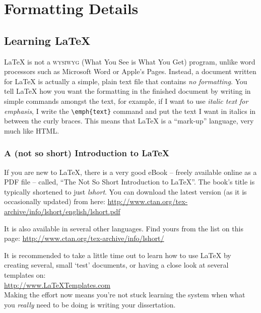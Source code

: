 
\chapter{Formatting Details} %

\label{AppendixA} %

\section{Learning \LaTeX{}}

\LaTeX{} is not a \textsc{wysiwyg} (What You See is What You Get) program, unlike word processors such as Microsoft Word or Apple's Pages. Instead, a document written for \LaTeX{} is actually a simple, plain text file that contains \emph{no formatting}. You tell \LaTeX{} how you want the formatting in the finished document by writing in simple commands amongst the text, for example, if I want to use \emph{italic text for emphasis}, I write the \texttt{\textbackslash emph\{text\}} command and put the text I want in italics in between the curly braces. This means that \LaTeX{} is a \enquote{mark-up} language, very much like HTML.

\subsection{A (not so short) Introduction to \LaTeX{}}

If you are new to \LaTeX{}, there is a very good eBook -- freely available online as a PDF file -- called, \enquote{The Not So Short Introduction to \LaTeX{}}. The book's title is typically shortened to just \emph{lshort}. You can download the latest version (as it is occasionally updated) from here:
\url{http://www.ctan.org/tex-archive/info/lshort/english/lshort.pdf}

It is also available in several other languages. Find yours from the list on this page: \url{http://www.ctan.org/tex-archive/info/lshort/}

It is recommended to take a little time out to learn how to use \LaTeX{} by creating several, small `test' documents, or having a close look at several templates on:\\ 
\url{http://www.LaTeXTemplates.com}\\ 
Making the effort now means you're not stuck learning the system when what you \emph{really} need to be doing is writing your dissertation.


